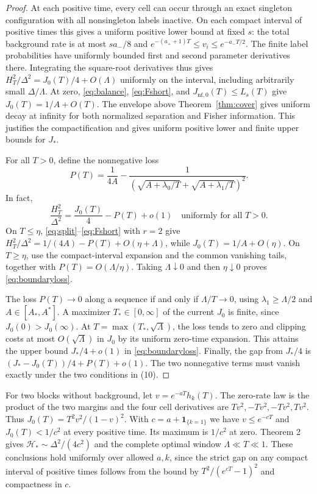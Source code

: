 \documentclass[11pt]{article}
\begin{document}
\begin{proof}
At each positive time, every cell can occur through an exact singleton configuration with all nonsingleton labels inactive. On each compact interval of positive times this gives a uniform positive lower bound at fixed \(s\): the total background rate is at most \(sa_-/8\) and \(e^{-(a_++1)T}\le v_i\le e^{-a_-T/2}\). The finite label probabilities have uniformly bounded first and second parameter derivatives there. Integrating the square-root derivatives thus gives \(H_T^2/\Delta^2=J_0(T)/4+O(\Lambda)\) uniformly on the interval, including arbitrarily small \(\Delta/\Lambda\). At zero, \eqref{eq:balance}, \eqref{eq:Fshort}, and \(J_{\mathrm{nf},0}(T)\le L_s(T)\) give \(J_0(T)=1/A+O(T)\). The envelope above Theorem~\ref{thm:cover} gives uniform decay at infinity for both normalized separation and Fisher information. This justifies the compactification and gives uniform positive lower and finite upper bounds for \(J_*\).

For all \(T>0\), define the nonnegative loss
\[
P(T)=\frac1{4A}-
\frac{1}{(\sqrt{A+\lambda_0/T}+\sqrt{A+\lambda_1/T})^2}.
\]
In fact,
\[
\frac{H_T^2}{\Delta^2}=\frac{J_0(T)}4-P(T)+o(1)
\quad\text{uniformly for all }T>0.
\tag{11}\label{eq:boundaryloss}
\]
On \(T\le\eta\), \eqref{eq:split}--\eqref{eq:Fshort} with \(r=2\) give \(H_T^2/\Delta^2=1/(4A)-P(T)+O(\eta+\Lambda)\), while \(J_0(T)=1/A+O(\eta)\). On \(T\ge\eta\), use the compact-interval expansion and the common vanishing tails, together with \(P(T)=O(\Lambda/\eta)\). Taking \(\Lambda\downarrow0\) and then \(\eta\downarrow0\) proves \eqref{eq:boundaryloss}.

The loss \(P(T)\to0\) along a sequence if and only if \(\Lambda/T\to0\), using \(\lambda_1\ge\Lambda/2\) and \(A\in[A_*,A^*]\). A maximizer \(T_*\in[0,\infty]\) of the current \(J_0\) is finite, since \(J_0(0)>J_0(\infty)\). At \(T=\max(T_*,\sqrt{\Lambda})\), the loss tends to zero and clipping costs at most \(O(\sqrt{\Lambda})\) in \(J_0\) by its uniform zero-time expansion. This attains the upper bound \(J_*/4+o(1)\) in \eqref{eq:boundaryloss}. Finally, the gap from \(J_*/4\) is \((J_*-J_0(T))/4+P(T)+o(1)\). The two nonnegative terms must vanish exactly under the two conditions in (10).
\end{proof}

For two blocks without background, let \(v=e^{-aT}h_k(T)\). The zero-rate law is the product of the two margins and the four cell derivatives are \(Tv^2,-Tv^2,-Tv^2,Tv^2\). Thus \(J_0(T)=T^2 v^2/(1-v)^2\). With \(c=a+\mathbf1_{\{k=1\}}\) we have \(v\le e^{-cT}\) and \(J_0(T)<1/c^2\) at every positive time. Its maximum is \(1/c^2\) at zero. Theorem 2 gives \(\mathcal H_*\sim\Delta^2/(4c^2)\) and the complete optimal window \(\Lambda\ll T\ll1\). These conclusions hold uniformly over allowed \(a,k\), since the strict gap on any compact interval of positive times follows from the bound by \(T^2/(e^{cT}-1)^2\) and compactness in \(c\).
\end{document}
